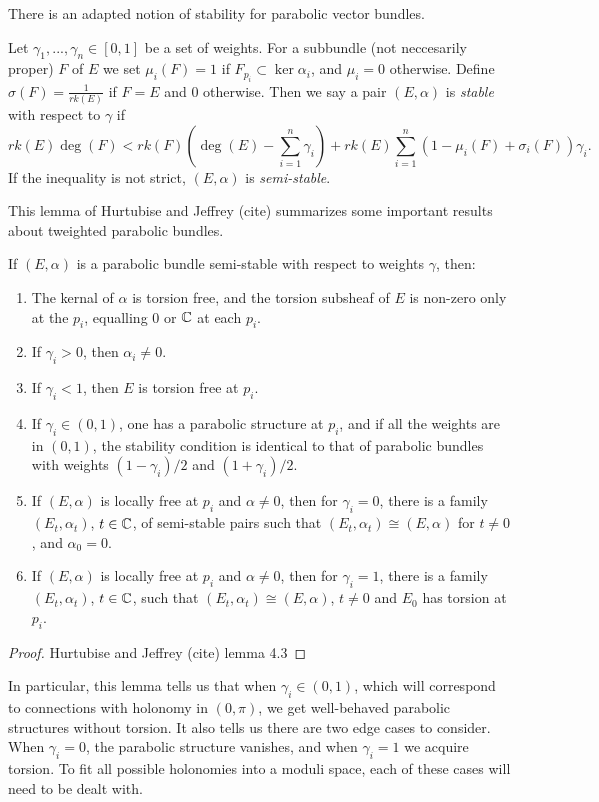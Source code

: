 	There is an adapted notion of stability for parabolic vector bundles.
	\begin{definition}
		Let $\gamma_1,...,\gamma_n \in [0,1]$ be a set of weights. For a subbundle (not neccesarily proper) $F$ of $E$ we set $\mu_i(F) = 1$ if $F_{p_i} \subset \ker\alpha_i$, and $\mu_i = 0$ otherwise. Define $\sigma(F) = \frac{1}{rk(E)}$ if $F=E$ and $0$ otherwise. Then we say a pair $(E,\alpha)$ is \emph{stable} with respect to $\gamma$ if 
		\begin{equation}
		rk(E)\deg(F) < rk(F)\left(\deg(E) - \sum_{i=1}^n \gamma_i\right) 
		+ rk(E)\sum_{i=1}^n(1 - \mu_i(F) + \sigma_i(F))\gamma_i.
		\end{equation}
		If the inequality is not strict, $(E,\alpha)$ is \emph{semi-stable}.
	\end{definition}
	This lemma of Hurtubise and Jeffrey (cite) summarizes some important results about tweighted parabolic bundles.
	\begin{lemma}
		\label{l:ss-lemma}
		If $(E,\alpha)$ is a parabolic bundle semi-stable with respect to weights $\gamma$, then:
		\begin{enumerate}
			\item The kernal of $\alpha$ is torsion free, and the torsion subsheaf of $E$ is non-zero only at the $p_i$, equalling $0$ or $\mathbb{C}$ at each $p_i$.
			\item If $\gamma_i >0$, then $\alpha_i \neq 0$.
			\item If $\gamma_i < 1$, then $E$ is torsion free at $p_i$.
			\item If $\gamma_i \in (0,1)$, one has a parabolic structure at $p_i$, and if all the weights are in $(0,1)$, the stability condition is identical to that of parabolic bundles with weights $(1-\gamma_i)/2$ and $(1+\gamma_i)/2$.
			\item If $(E,\alpha)$ is locally free at $p_i$ and $\alpha \neq 0$, then for $\gamma_i = 0$, there is a family $(E_t, \alpha_t)$, $t\in \mathbb{C}$, of semi-stable pairs such that $(E_t,\alpha_t)\cong (E,\alpha)$ for $t\neq 0$, and $\alpha_0 = 0$. 
			\item If $(E,\alpha)$ is locally free at $p_i$ and $\alpha \neq 0$, then for $\gamma_i = 1$, there is a family $(E_t,\alpha_t)$, $t\in \mathbb{C}$, such that $(E_t, \alpha_t)\cong (E,\alpha)$, $t\neq 0$ and $E_0$ has torsion at $p_i$.
		\end{enumerate}
	\end{lemma}
	\begin{proof}
		Hurtubise and Jeffrey (cite) lemma 4.3
	\end{proof}
	In particular, this lemma tells us that when $\gamma_i\in (0,1)$, which will correspond to connections with holonomy in $(0,\pi)$, we get well-behaved parabolic structures without torsion. It also tells us there are two edge cases to consider. When $\gamma_i = 0$, the parabolic structure vanishes, and when $\gamma_i = 1$ we acquire torsion. To fit all possible holonomies into a moduli space, each of these cases will need to be dealt with.
	
